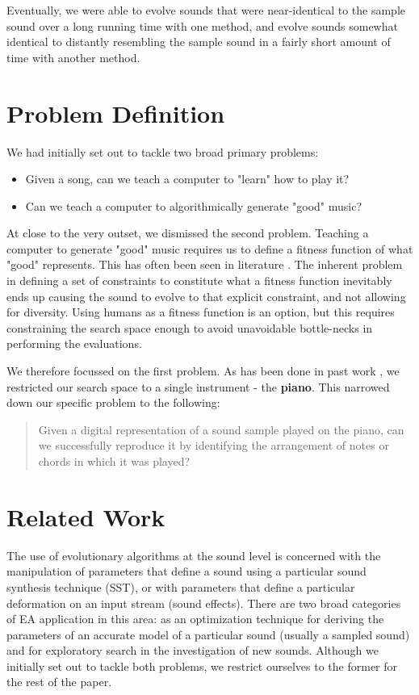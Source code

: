 \documentclass{pnastwo}
\begin{document}
\begin{article}
Eventually, we were able to evolve sounds that were near-identical to the sample sound over a long running time with one method, and evolve sounds somewhat identical to distantly resembling the sample sound in a fairly short amount of time with another method.

\section{Problem Definition}
We had initially set out to tackle two broad primary problems:
\begin{itemize}
\item Given a song, can we teach a computer to "learn" how to play it?
\item Can we teach a computer to algorithmically generate "good" music?
\end{itemize}
At close to the very outset, we dismissed the second problem. Teaching a computer to generate "good" music requires us to define a fitness function of what "good" represents. This has often been seen in literature \cite{biles} \cite{copley}. The inherent problem in defining a set of constraints to constitute what a fitness function inevitably ends up causing the sound to evolve to that explicit constraint, and not allowing for diversity. Using humans as a fitness function is an option, but this requires constraining the search space enough to avoid unavoidable bottle-necks in performing the evaluations. 

We therefore focussed on the first problem. As has been done in past work \cite{garcia}, we restricted our search space to a single instrument - the \textbf{piano}. This narrowed down our specific problem to the following:

\begin{quote} 
Given a digital representation of a sound sample played on the piano, can we successfully reproduce it by identifying the arrangement of notes or chords in which it was played?
\end{quote}


\section{Related Work}
The use of evolutionary algorithms at the sound level is concerned with the manipulation of parameters
that define a sound using a particular sound synthesis technique (SST), or with
parameters that define a particular deformation on an input stream (sound effects).
There are two broad categories of EA application in this area: as an optimization
technique for deriving the parameters of an accurate model of a particular sound
(usually a sampled sound) and for exploratory search in the investigation of new sounds. \cite{emcee} Although we initially set out to tackle both problems, we restrict ourselves to the former for the rest of the paper. 


\end{article}
\end{document}
